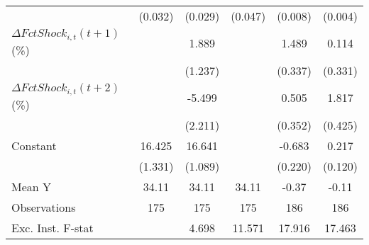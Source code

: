 {\begin{tabular}{l*{5}{c}}
                    &     (0.032)         &     (0.029)         &     (0.047)         &     (0.008)         &     (0.004)         \\
\addlinespace
$ \Delta FctShock_{i,t}(t+1)$ (\%)&                     &       1.889         &                     &       1.489\sym{***}&       0.114         \\
                    &                     &     (1.237)         &                     &     (0.337)         &     (0.331)         \\
\addlinespace
$ \Delta FctShock_{i,t}(t+2)$ (\%)&                     &      -5.499\sym{**} &                     &       0.505         &       1.817\sym{***}\\
                    &                     &     (2.211)         &                     &     (0.352)         &     (0.425)         \\
\addlinespace
Constant            &      16.425\sym{***}&      16.641\sym{***}&                     &      -0.683\sym{**} &       0.217         \\
                    &     (1.331)         &     (1.089)         &                     &     (0.220)         &     (0.120)         \\
\midrule
Mean Y              &       34.11         &       34.11         &       34.11         &       -0.37         &       -0.11         \\
Observations        &         175         &         175         &         175         &         186         &         186         \\
Exc. Inst. F-stat   &                     &       4.698         &      11.571         &      17.916         &      17.463         \\
\bottomrule
\end{tabular}
}
